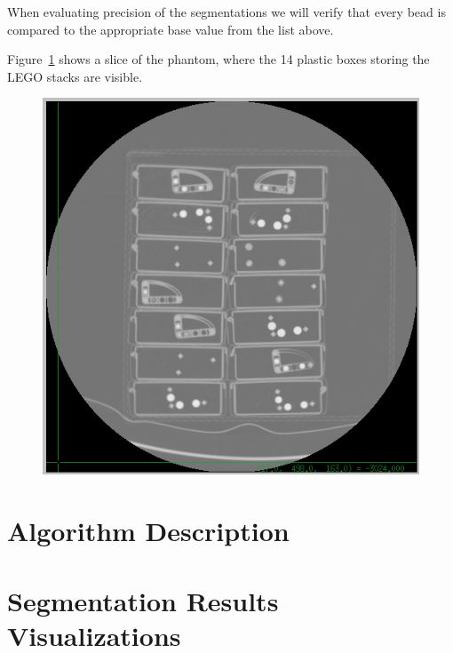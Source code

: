 \documentclass{InsightArticle}
\begin{document}
When evaluating precision of the segmentations we will verify that every bead
is compared to the appropriate base value from the list above.

Figure~\ref{fig:GlobalView} shows a slice of the phantom, where the 14 plastic
boxes storing the LEGO stacks are visible.

\begin{figure}
\center
\includegraphics[width=1.0\textwidth]{NIST_A.png}
\label{fig:GlobalView}
\end{figure}
\clearpage

\section{Algorithm Description}

\section{Segmentation Results Visualizations}


\small
\listoffigures
\listoftables
\normalsize
\end{document}
